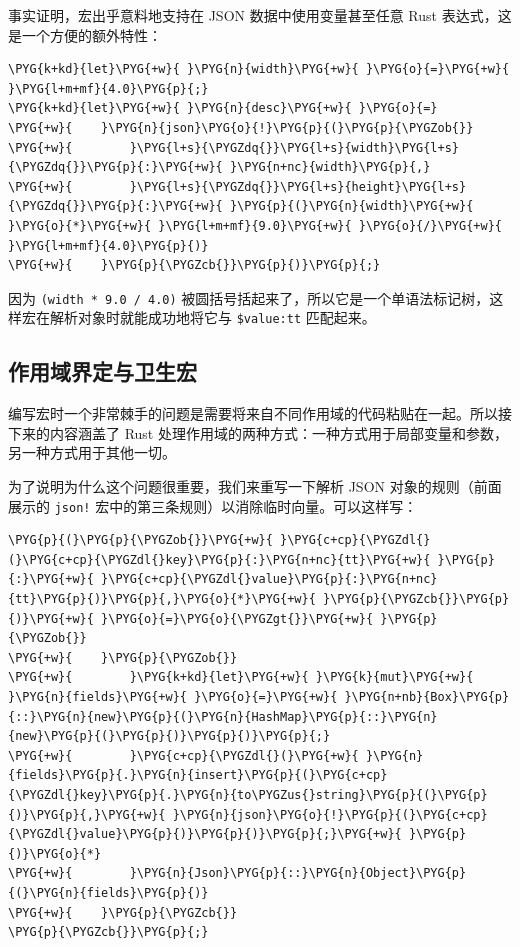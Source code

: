 事实证明，宏出乎意料地支持在 JSON 数据中使用变量甚至任意 Rust 表达式，这是一个方便的额外特性：

\begin{Verbatim}[commandchars=\\\{\},breaklines=true,breakanywhere=true,fontsize=\codefont,xleftmargin=17bp]
\PYG{k+kd}{let}\PYG{+w}{ }\PYG{n}{width}\PYG{+w}{ }\PYG{o}{=}\PYG{+w}{ }\PYG{l+m+mf}{4.0}\PYG{p}{;}
\PYG{k+kd}{let}\PYG{+w}{ }\PYG{n}{desc}\PYG{+w}{ }\PYG{o}{=}
\PYG{+w}{    }\PYG{n}{json}\PYG{o}{!}\PYG{p}{(}\PYG{p}{\PYGZob{}}
\PYG{+w}{        }\PYG{l+s}{\PYGZdq{}}\PYG{l+s}{width}\PYG{l+s}{\PYGZdq{}}\PYG{p}{:}\PYG{+w}{ }\PYG{n+nc}{width}\PYG{p}{,}
\PYG{+w}{        }\PYG{l+s}{\PYGZdq{}}\PYG{l+s}{height}\PYG{l+s}{\PYGZdq{}}\PYG{p}{:}\PYG{+w}{ }\PYG{p}{(}\PYG{n}{width}\PYG{+w}{ }\PYG{o}{*}\PYG{+w}{ }\PYG{l+m+mf}{9.0}\PYG{+w}{ }\PYG{o}{/}\PYG{+w}{ }\PYG{l+m+mf}{4.0}\PYG{p}{)}
\PYG{+w}{    }\PYG{p}{\PYGZcb{}}\PYG{p}{)}\PYG{p}{;}
\end{Verbatim}

因为 \texttt{(width * 9.0 / 4.0)} 被圆括号括起来了，所以它是一个单语法标记树，这样宏在解析对象时就能成功地将它与 \texttt{\$value:tt} 匹配起来。

\subsection{作用域界定与卫生宏}

编写宏时一个非常棘手的问题是需要将来自不同作用域的代码粘贴在一起。所以接下来的内容涵盖了 Rust 处理作用域的两种方式：一种方式用于局部变量和参数，另一种方式用于其他一切。

为了说明为什么这个问题很重要，我们来重写一下解析 JSON 对象的规则（前面展示的 \texttt{json!} 宏中的第三条规则）以消除临时向量。可以这样写：

\begin{Verbatim}[commandchars=\\\{\},breaklines=true,breakanywhere=true,fontsize=\codefont,xleftmargin=17bp]
\PYG{p}{(}\PYG{p}{\PYGZob{}}\PYG{+w}{ }\PYG{c+cp}{\PYGZdl{}(}\PYG{c+cp}{\PYGZdl{}key}\PYG{p}{:}\PYG{n+nc}{tt}\PYG{+w}{ }\PYG{p}{:}\PYG{+w}{ }\PYG{c+cp}{\PYGZdl{}value}\PYG{p}{:}\PYG{n+nc}{tt}\PYG{p}{)}\PYG{p}{,}\PYG{o}{*}\PYG{+w}{ }\PYG{p}{\PYGZcb{}}\PYG{p}{)}\PYG{+w}{ }\PYG{o}{=}\PYG{o}{\PYGZgt{}}\PYG{+w}{ }\PYG{p}{\PYGZob{}}
\PYG{+w}{    }\PYG{p}{\PYGZob{}}
\PYG{+w}{        }\PYG{k+kd}{let}\PYG{+w}{ }\PYG{k}{mut}\PYG{+w}{ }\PYG{n}{fields}\PYG{+w}{ }\PYG{o}{=}\PYG{+w}{ }\PYG{n+nb}{Box}\PYG{p}{::}\PYG{n}{new}\PYG{p}{(}\PYG{n}{HashMap}\PYG{p}{::}\PYG{n}{new}\PYG{p}{(}\PYG{p}{)}\PYG{p}{)}\PYG{p}{;}
\PYG{+w}{        }\PYG{c+cp}{\PYGZdl{}(}\PYG{+w}{ }\PYG{n}{fields}\PYG{p}{.}\PYG{n}{insert}\PYG{p}{(}\PYG{c+cp}{\PYGZdl{}key}\PYG{p}{.}\PYG{n}{to\PYGZus{}string}\PYG{p}{(}\PYG{p}{)}\PYG{p}{,}\PYG{+w}{ }\PYG{n}{json}\PYG{o}{!}\PYG{p}{(}\PYG{c+cp}{\PYGZdl{}value}\PYG{p}{)}\PYG{p}{)}\PYG{p}{;}\PYG{+w}{ }\PYG{p}{)}\PYG{o}{*}
\PYG{+w}{        }\PYG{n}{Json}\PYG{p}{::}\PYG{n}{Object}\PYG{p}{(}\PYG{n}{fields}\PYG{p}{)}
\PYG{+w}{    }\PYG{p}{\PYGZcb{}}
\PYG{p}{\PYGZcb{}}\PYG{p}{;}
\end{Verbatim}

